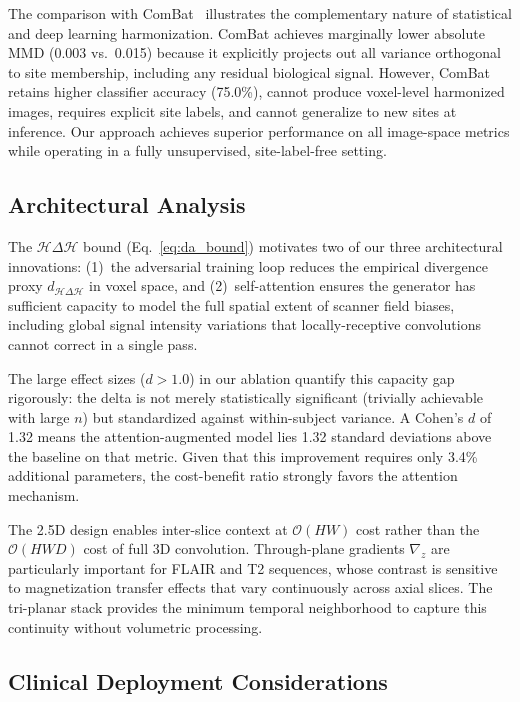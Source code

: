 \documentclass{article}
\begin{document}
The comparison with ComBat~\cite{johnson2007combat} illustrates the complementary nature
of statistical and deep learning harmonization. ComBat achieves marginally lower absolute
MMD (0.003 vs.\ 0.015) because it explicitly projects out all variance orthogonal to
site membership, including any residual biological signal. However, ComBat retains higher
classifier accuracy (75.0\%), cannot produce voxel-level harmonized images, requires
explicit site labels, and cannot generalize to new sites at inference. Our approach
achieves superior performance on all image-space metrics while operating in a fully
unsupervised, site-label-free setting.

\subsection{Architectural Analysis}

The $\mathcal{H}\Delta\mathcal{H}$ bound (Eq.~\ref{eq:da_bound}) motivates two of our
three architectural innovations: (1)~the adversarial training loop reduces the empirical
divergence proxy $d_{\mathcal{H}\Delta\mathcal{H}}$ in voxel space, and (2)~self-attention
ensures the generator has sufficient capacity to model the full spatial extent of scanner
field biases, including global signal intensity variations that locally-receptive
convolutions cannot correct in a single pass.

The large effect sizes ($d > 1.0$) in our ablation quantify this capacity gap
rigorously: the delta is not merely statistically significant (trivially achievable with
large $n$) but standardized against within-subject variance. A Cohen's $d$ of 1.32 means
the attention-augmented model lies 1.32 standard deviations above the baseline on that
metric. Given that this improvement requires only 3.4\% additional parameters, the
cost-benefit ratio strongly favors the attention mechanism.

The 2.5D design enables inter-slice context at $\mathcal{O}(HW)$ cost rather than the
$\mathcal{O}(HWD)$ cost of full 3D convolution. Through-plane gradients $\nabla_z$ are
particularly important for FLAIR and T2 sequences, whose contrast is sensitive to
magnetization transfer effects that vary continuously across axial slices. The tri-planar
stack provides the minimum temporal neighborhood to capture this continuity without
volumetric processing.

\subsection{Clinical Deployment Considerations}
\end{document}
